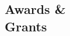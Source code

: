 \documentclass[margin]{res}
\begin{document}
\begin{resume}




\section{Awards \& \\Grants} 


\end{resume}
\end{document}
